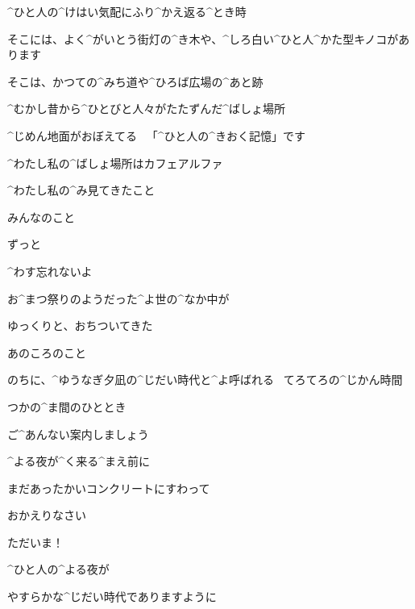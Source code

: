 \Alpha ^{ひと}{人}の^{けはい}{気配}にふり^{かえ}{返}る^{とき}{時}

\Alpha そこには、よく^{がいとう}{街灯}の^{き}{木}や、^{しろ}{白}い^{ひと}{人}^{かた}{型}キノコがあります

\Alpha そこは、かつての^{みち}{道}や^{ひろば}{広場}の^{あと}{跡}

\Alpha ^{むかし}{昔}から^{ひとびと}{人々}がたたずんだ^{ばしょ}{場所}

\Alpha ^{じめん}{地面}がおぼえてる
\ 「^{ひと}{人}の^{きおく}{記憶}」です

\page
\Alpha ^{わたし}{私}の^{ばしょ}{場所}はカフェアルファ

\Alpha ^{わたし}{私}の^{み}{見}てきたこと

\Alpha みんなのこと

\page
\Alpha ずっと

\Alpha ^{わす}{忘}れないよ

\Alpha お^{まつ}{祭}りのようだった^{よ}{世}の^{なか}{中}が

\Alpha ゆっくりと、おちついてきた

\Alpha あのころのこと

\page
\Alpha のちに、^{ゆうなぎ}{夕凪}の^{じだい}{時代}と^{よ}{呼}ばれる
\ てろてろの^{じかん}{時間}

\Alpha つかの^{ま}{間}のひととき

\Alpha ご^{あんない}{案内}しましょう

\Alpha ^{よる}{夜}が^{く}{来}る^{まえ}{前}に

\Alpha まだあったかいコンクリートにすわって

\Kokone おかえりなさい

\page
\Alpha ただいま！

\Alpha ^{ひと}{人}の^{よる}{夜}が

\Alpha やすらかな^{じだい}{時代}でありますように

